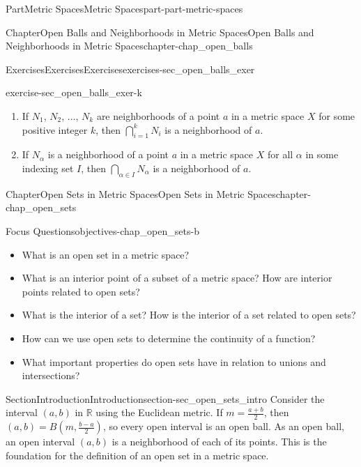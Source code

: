 \documentclass[oneside,10pt,]{book}
\numberwithin{equation}{chapter}
\newcommand{\R}{\mathbb{R}}
\begin{document}
\begin{partptx}{Part}{Metric Spaces}{}{Metric Spaces}{}{}{part-part-metric-spaces}
\begin{chapterptx}{Chapter}{Open Balls and Neighborhoods in Metric Spaces}{}{Open Balls and Neighborhoods in Metric Spaces}{}{}{chapter-chap_open_balls}
\begin{exercises-section}{Exercises}{Exercises}{}{Exercises}{}{}{exercises-sec_open_balls_exer}
\begin{divisionexercise}{11}{}{}{exercise-sec_open_balls_exer-k}
\begin{enumerate}[font=\bfseries,label=(\alph*),ref=\alph*]
\item{}If \(N_1\), \(N_2\), \(\ldots\), \(N_k\) are neighborhoods of a point \(a\) in a metric space \(X\) for some positive integer \(k\), then \(\bigcap_{i=1}^k N_i\) is a neighborhood of \(a\).%
\item{}If \(N_{\alpha}\) is a neighborhood of a point \(a\) in a metric space \(X\) for all \(\alpha\) in some indexing set \(I\), then \(\bigcap_{\alpha \in I} N_{\alpha}\) is a neighborhood of \(a\).%
\end{enumerate}%
\end{divisionexercise}%
\end{exercises-section}
\end{chapterptx}
%
\typeout{************************************************}
\typeout{************************************************}
%
\begin{chapterptx}{Chapter}{Open Sets in Metric Spaces}{}{Open Sets in Metric Spaces}{}{}{chapter-chap_open_sets}
\renewcommand*{\chaptername}{Chapter}
\begin{objectives}{Focus Questions}{objectives-chap_open_sets-b}
%
\begin{itemize}[label=\textbullet]
\item{}What is an open set in a metric space?%
\item{}What is an interior point of a subset of a metric space? How are interior points related to open sets?%
\item{}What is the interior of a set? How is the interior of a set related to open sets?%
\item{}How can we use open sets to determine the continuity of a function?%
\item{}What important properties do open sets have in relation to unions and intersections?%
\end{itemize}
\end{objectives}
%
%
\typeout{************************************************}
\typeout{************************************************}
%
\begin{sectionptx}{Section}{Introduction}{}{Introduction}{}{}{section-sec_open_sets_intro}
Consider the interval \((a,b)\) in \(\R\) using the Euclidean metric. If \(m = \frac{a+b}{2}\), then \((a,b) = B\left(m,\frac{b-a}{2}\right)\), so every open interval is an open ball. As an open ball, an open interval \((a,b)\) is a neighborhood of each of its points. This is the foundation for the definition of an open set in a metric space.%

\end{sectionptx}
\end{chapterptx}
\end{partptx}
\end{document}
